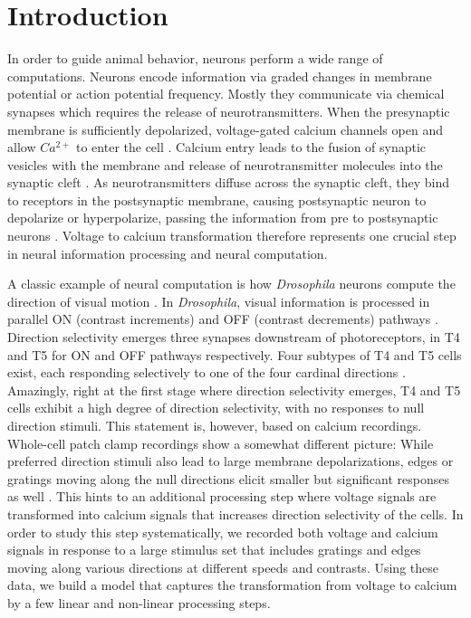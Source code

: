 \documentclass[9pt,lineno]{elife}
\begin{document}
\section{Introduction}
In order to guide animal behavior, neurons perform a wide range of computations. Neurons encode information via graded changes in membrane potential or action potential frequency. Mostly they communicate via chemical synapses which requires the release of neurotransmitters. When the presynaptic membrane is sufficiently depolarized, voltage-gated calcium channels open and allow $Ca^{2+}$ to enter the cell \parencite{Luo2020}. Calcium entry leads to the fusion of synaptic vesicles with the membrane and release of neurotransmitter molecules into the synaptic cleft \parencite{Chapman2002}.  As neurotransmitters diffuse across the synaptic cleft, they bind to receptors in the postsynaptic membrane, causing postsynaptic neuron to depolarize or hyperpolarize, passing the information from pre to postsynaptic neurons \parencite{Maio2008}. Voltage to calcium transformation therefore represents one crucial step in neural information processing and neural computation. 

A classic example of neural computation is how \textit{Drosophila} neurons compute the direction of visual motion \parencite{Borst2020}. In \textit{Drosophila}, visual information is processed in parallel ON (contrast increments) and OFF (contrast decrements) pathways \parencite{Joesch2010, Eichner2011}. Direction selectivity emerges three synapses downstream of photoreceptors, in T4 and T5 for ON and OFF pathways respectively. Four subtypes of T4 and T5 cells exist, each responding selectively to one of the four cardinal directions \parencite{Maisak2013}. Amazingly, right at the first stage where direction selectivity emerges, T4 and T5 cells exhibit a high degree of direction selectivity, with no responses to null direction stimuli. This statement is, however, based on calcium recordings. Whole-cell patch clamp recordings show a somewhat different picture: While preferred direction stimuli also lead to large membrane depolarizations, edges or gratings moving along the null directions elicit smaller but significant responses as well \parencite{Groschner2022, Wienecke2018}. This hints to an additional processing step where voltage signals are transformed into calcium signals that increases direction selectivity of the cells. In order to study this step systematically, we recorded both voltage and calcium signals in response to a large stimulus set that includes gratings and edges moving along various directions at different speeds and contrasts. Using these data, we build a model that captures the transformation from voltage to calcium by a few linear and non-linear processing steps.
\end{document}

